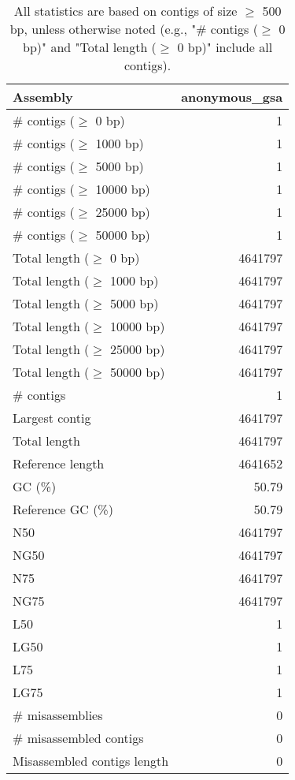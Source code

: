 \documentclass[12pt,a4paper]{article}
\begin{document}
\begin{table}[ht]
\begin{center}
\caption{All statistics are based on contigs of size $\geq$ 500 bp, unless otherwise noted (e.g., "\# contigs ($\geq$ 0 bp)" and "Total length ($\geq$ 0 bp)" include all contigs).}
\begin{tabular}{|l*{1}{|r}|}
\hline
Assembly & anonymous\_gsa \\ \hline
\# contigs ($\geq$ 0 bp) & 1 \\ \hline
\# contigs ($\geq$ 1000 bp) & 1 \\ \hline
\# contigs ($\geq$ 5000 bp) & 1 \\ \hline
\# contigs ($\geq$ 10000 bp) & 1 \\ \hline
\# contigs ($\geq$ 25000 bp) & 1 \\ \hline
\# contigs ($\geq$ 50000 bp) & 1 \\ \hline
Total length ($\geq$ 0 bp) & 4641797 \\ \hline
Total length ($\geq$ 1000 bp) & 4641797 \\ \hline
Total length ($\geq$ 5000 bp) & 4641797 \\ \hline
Total length ($\geq$ 10000 bp) & 4641797 \\ \hline
Total length ($\geq$ 25000 bp) & 4641797 \\ \hline
Total length ($\geq$ 50000 bp) & 4641797 \\ \hline
\# contigs & 1 \\ \hline
Largest contig & 4641797 \\ \hline
Total length & 4641797 \\ \hline
Reference length & 4641652 \\ \hline
GC (\%) & 50.79 \\ \hline
Reference GC (\%) & 50.79 \\ \hline
N50 & 4641797 \\ \hline
NG50 & 4641797 \\ \hline
N75 & 4641797 \\ \hline
NG75 & 4641797 \\ \hline
L50 & 1 \\ \hline
LG50 & 1 \\ \hline
L75 & 1 \\ \hline
LG75 & 1 \\ \hline
\# misassemblies & 0 \\ \hline
\# misassembled contigs & 0 \\ \hline
Misassembled contigs length & 0 \\ \hline

\end{tabular}
\end{center}
\end{table}
\end{document}
